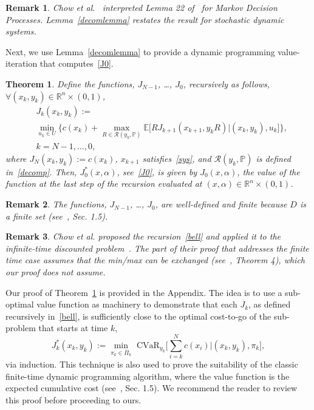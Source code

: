 \documentclass[letterpaper, 10 pt, conference]{ieeeconf}  %
\newtheorem{theorem}{Theorem}
\newtheorem{remark}{Remark}
\begin{document}
\begin{remark}
Chow et al.~\cite{chow2015risk} interpreted Lemma 22 of~\cite{pflug2016time} for Markov Decision Processes.
Lemma~\ref{decomlemma} restates the result for stochastic dynamic systems.
\end{remark}

Next, we use Lemma~\ref{decomlemma} to provide a dynamic programming value-iteration that computes~\eqref{J0}.
\begin{theorem}\label{thm}
Define the functions, $J_{N-1}$, \dots, $J_0$, recursively as follows, $\forall (x_k, y_k) \in \mathbb{R}^n \times (0,1)$,
\begin{equation}\begin{aligned}
& J_k(x_k,y_k) := \\
& {\underset{u_k \in U}\min} \Bigg\{ c(x_k) + {\underset{R \in \mathcal{R}(y_k, \mathbb{P})}\max} \mathbb{E}\Big[ R J_{k+1}(x_{k+1}, y_k R) \Big| (x_k, y_k), u_k \Big] \Bigg\}, \\
& k = N-1, \dots, 0,
\end{aligned}\label{bell}\end{equation}
where $J_N(x_k, y_k) := c(x_k)$, $x_{k+1}$ satisfies~\eqref{sys}, and $\mathcal{R}(y_k, \mathbb{P})$ is defined in~\eqref{decomp}.  
Then, $J_0^*(x,\alpha)$, see~\eqref{J0}, is given by $J_0(x, \alpha)$, 
the value of the function at the last step of the recursion evaluated at $(x,\alpha) \in \mathbb{R}^n \times (0,1)$.
\end{theorem}
\begin{remark}
The functions, $J_{N-1}$, \dots, $J_0$, are well-defined and finite because $D$ is a finite set (see~\cite{bertsekas2005dynamic}, Sec. 1.5).
\end{remark}
\begin{remark}
Chow et al. proposed the recursion~\eqref{bell} and applied it to the infinite-time discounted problem~\cite{chow2015risk}. 
The part of their proof that addresses the finite time case assumes that the min/max can be exchanged (see~\cite{chow2015risk}, Theorem 4),
which our proof does not assume. 
\end{remark}

Our proof of Theorem~\ref{thm} is provided in the Appendix.
The idea is to use a sub-optimal value function as machinery to demonstrate that each $J_k$, as defined recursively in~\eqref{bell},
is sufficiently close to the optimal cost-to-go of the sub-problem that starts at time $k$,
\begin{equation}
J_k^*(x_k, y_k) := {\underset{\pi_k \in \bar{\Pi}_k}\min} \text{ CVaR}_{y_k} \Big[ \textstyle\sum_{i=k}^N c(x_i) \Big| (x_k, y_k), \pi_k \Big],
\end{equation}
via induction. This technique is also used to prove the suitability of the classic finite-time dynamic programming algorithm, 
where the value function is the expected cumulative cost (see~\cite{bertsekas2005dynamic}, Sec. 1.5).
We recommend the reader to review this proof before proceeding to ours. 
\end{document}
